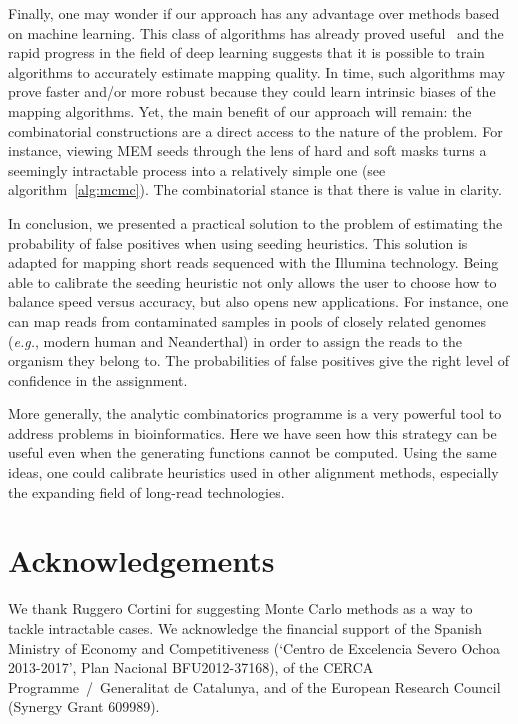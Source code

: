\documentclass{article}
\begin{document}
Finally, one may wonder if our approach has any advantage over methods
based on machine learning. This class of algorithms has already proved
useful~\cite{lee2014mosaik} and the rapid progress in the field of deep
learning suggests that it is possible to train algorithms to accurately
estimate mapping quality. In time, such algorithms may prove faster and/or
more robust because they could learn intrinsic biases of the mapping
algorithms. Yet, the main benefit of our approach will remain: the
combinatorial constructions are a direct access to the nature of the
problem. For instance, viewing MEM seeds through the lens of hard and soft
masks turns a seemingly intractable process into a relatively simple one
(see algorithm~\ref{alg:mcmc}). The combinatorial stance is that there is
value in clarity.

In conclusion, we presented a practical solution to the problem of
estimating the probability of false positives when using seeding
heuristics. This solution is adapted for mapping short reads sequenced
with the Illumina technology. Being able to calibrate the seeding
heuristic not only allows the user to choose how to balance speed versus
accuracy, but also opens new applications. For instance, one can map reads
from contaminated samples in pools of closely related genomes
(\textit{e.g.}, modern human and Neanderthal) in order to assign the reads
to the organism they belong to. The probabilities of false positives give
the right level of confidence in the assignment.

More generally, the analytic combinatorics programme is a very powerful
tool to address problems in bioinformatics. Here we have seen how this
strategy can be useful even when the generating functions cannot be
computed. Using the same ideas, one could calibrate heuristics used in
other alignment methods, especially the expanding field of long-read
technologies.


\section*{Acknowledgements}

We thank Ruggero Cortini for suggesting Monte Carlo methods as a way to
tackle intractable cases. We acknowledge the financial support of the
Spanish Ministry of Economy and Competitiveness (‘Centro de Excelencia
Severo Ochoa 2013-2017’, Plan Nacional BFU2012-37168), of the CERCA
Programme~/~Generalitat de Catalunya, and of the European Research Council
(Synergy Grant 609989).






\end{document}

